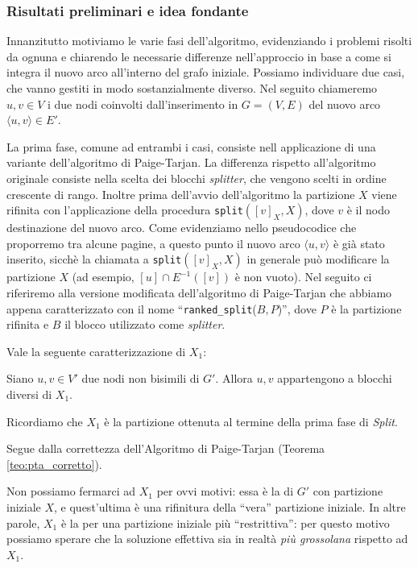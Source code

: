 \subsubsection{Risultati preliminari e idea fondante}
Innanzitutto motiviamo le varie fasi dell'algoritmo, evidenziando i problemi risolti da ognuna e chiarendo le necessarie differenze nell'approccio in base a come si integra il nuovo arco all'interno del grafo iniziale. Possiamo individuare due casi, che vanno gestiti in modo sostanzialmente diverso. Nel seguito chiameremo $u,v \in V$ i due nodi coinvolti dall'inserimento in $G = (V,E)$ del nuovo arco $\langle u,v \rangle \in E'$.

La prima fase, comune ad entrambi i casi, consiste nell applicazione di una variante dell'algoritmo di Paige-Tarjan. La differenza rispetto all'algoritmo originale consiste nella scelta dei blocchi \emph{splitter}, che vengono scelti in ordine crescente di rango. Inoltre prima dell'avvio dell'algoritmo la partizione $X$ viene rifinita con l'applicazione della procedura \texttt{split}$([v]_X, X)$, dove $v$ è il nodo destinazione del nuovo arco. Come evidenziamo nello pseudocodice che proporremo tra alcune pagine, a questo punto il nuovo arco $\langle u,v \rangle$ è già stato inserito, sicchè la chiamata a \texttt{split}$([v]_X, X)$ in generale può modificare la partizione $X$ (ad esempio, $[u] \cap E^{-1}([v])$ è non vuoto). Nel seguito ci riferiremo alla versione modificata dell'algoritmo di Paige-Tarjan che abbiamo appena caratterizzato con il nome ``\texttt{ranked\_split}($B,P$)'', dove $P$ è la partizione rifinita e $B$ il blocco utilizzato come \emph{splitter}.

Vale la seguente caratterizzazione di $X_1$:
\begin{proposition}
    \label{prop:x1_prop}
    Siano $u,v \in V'$ due nodi non bisimili di $G'$. Allora $u,v$ appartengono a blocchi diversi di $X_1$.
\end{proposition}
Ricordiamo che $X_1$ è la partizione ottenuta al termine della prima fase di \emph{Split}.
\begin{proof2}
    Segue dalla correttezza dell'Algoritmo di Paige-Tarjan (Teorema \ref{teo:pta_corretto}).
\end{proof2}

Non possiamo fermarci ad $X_1$ per ovvi motivi: essa è la \rscpnomath di $G'$ con partizione iniziale $X$, e quest'ultima è una rifinitura della ``vera'' partizione iniziale. In altre parole, $X_1$ è la \rscpnomath per una partizione iniziale più ``restrittiva'': per questo motivo possiamo sperare che la soluzione effettiva sia in realtà \emph{più grossolana} rispetto ad $X_1$.

